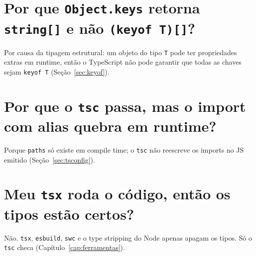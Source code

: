 \documentclass[12pt,a4paper,oneside]{book}
\newcommand{\code}[1]{\texttt{#1}}
\begin{document}
\section*{Por que \texttt{Object.keys} retorna \texttt{string[]} e não \texttt{(keyof T)[]}?}
Por causa da tipagem estrutural: um objeto do tipo \code{T} pode ter propriedades extras em runtime, então o TypeScript não pode garantir que todas as chaves sejam \code{keyof T} (Seção~\ref{sec:keyof}).

\section*{Por que o \texttt{tsc} passa, mas o import com alias quebra em runtime?}
Porque \code{paths} só existe em compile time; o \code{tsc} não reescreve os imports no JS emitido (Seção~\ref{sec:tsconfig}).

\section*{Meu \texttt{tsx} roda o código, então os tipos estão certos?}
Não. \code{tsx}, \code{esbuild}, \code{swc} e o type stripping do Node apenas apagam os tipos. Só o \code{tsc} checa (Capítulo~\ref{cap:ferramentas}).

\printindex
\end{document}

